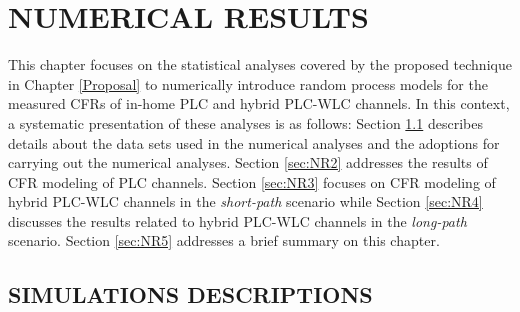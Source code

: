 \chapter{NUMERICAL RESULTS}  \label{NumericalResults}

This chapter focuses on the statistical analyses covered by the proposed technique in Chapter \ref{Proposal} to numerically introduce random process models for the  measured \acp{CFR} of in-home \ac{PLC} and hybrid \ac{PLC}-\ac{WLC} channels. In this context, a systematic presentation of these analyses is as follows: Section \ref{sec:NR1} describes details about the data sets used in the numerical analyses and the adoptions for carrying out the numerical analyses. Section \ref{sec:NR2} addresses the results of \ac{CFR} modeling of \ac{PLC} channels. Section \ref{sec:NR3} focuses on \ac{CFR} modeling of hybrid \ac{PLC}-\ac{WLC} channels in the \textit{short-path} scenario while Section \ref{sec:NR4} discusses the results related to hybrid \ac{PLC}-\ac{WLC} channels in the \textit{long-path} scenario. Section \ref{sec:NR5} addresses a brief summary on this chapter.

\section{SIMULATIONS DESCRIPTIONS}\label{sec:NR1}


